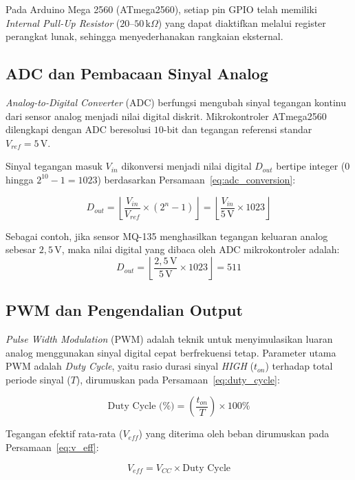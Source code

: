 Pada Arduino Mega 2560 (ATmega2560), setiap pin GPIO telah memiliki \textit{Internal Pull-Up Resistor} ($20\text{--}50\,\text{k}\Omega$) yang dapat diaktifkan melalui register perangkat lunak, sehingga menyederhanakan rangkaian eksternal.

\subsection{ADC dan Pembacaan Sinyal Analog}
\textit{Analog-to-Digital Converter} (ADC) berfungsi mengubah sinyal tegangan kontinu dari sensor analog menjadi nilai digital diskrit. Mikrokontroler ATmega2560 dilengkapi dengan ADC beresolusi $10\text{-bit}$ dan tegangan referensi standar $V_{ref} = 5\,\text{V}$.

Sinyal tegangan masuk $V_{in}$ dikonversi menjadi nilai digital $D_{out}$ bertipe integer ($0$ hingga $2^{10}-1 = 1023$) berdasarkan Persamaan~\eqref{eq:adc_conversion}:

\begin{equation}
	\label{eq:adc_conversion}
	D_{out} = \left\lfloor \frac{V_{in}}{V_{ref}} \times (2^n - 1) \right\rfloor = \left\lfloor \frac{V_{in}}{5\,\text{V}} \times 1023 \right\rfloor
\end{equation}

Sebagai contoh, jika sensor MQ-135 menghasilkan tegangan keluaran analog sebesar $2{,}5\,\text{V}$, maka nilai digital yang dibaca oleh ADC mikrokontroler adalah:
\[
	D_{out} = \left\lfloor \frac{2{,}5\,\text{V}}{5\,\text{V}} \times 1023 \right\rfloor = 511
\]

\subsection{PWM dan Pengendalian Output}
\textit{Pulse Width Modulation} (PWM) adalah teknik untuk menyimulasikan luaran analog menggunakan sinyal digital cepat berfrekuensi tetap. Parameter utama PWM adalah \textit{Duty Cycle}, yaitu rasio durasi sinyal \textit{HIGH} ($t_{on}$) terhadap total periode sinyal ($T$), dirumuskan pada Persamaan~\eqref{eq:duty_cycle}:

\begin{equation}
	\label{eq:duty_cycle}
	\text{Duty Cycle (\%)} = \left( \frac{t_{on}}{T} \right) \times 100\%
\end{equation}

Tegangan efektif rata-rata ($V_{eff}$) yang diterima oleh beban dirumuskan pada Persamaan~\eqref{eq:v_eff}:

\begin{equation}
	\label{eq:v_eff}
	V_{eff} = V_{CC} \times \text{Duty Cycle}
\end{equation}

